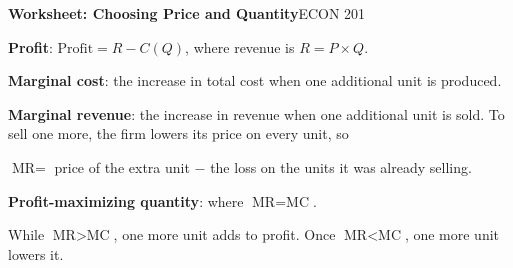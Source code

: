 \documentclass[11pt]{article}
\begin{document}
{\LARGE\bfseries\color{accent} Worksheet: Choosing Price and Quantity}\hfill{\large ECON 201}

\newcommand{\term}[1]{\textcolor{accentdark}{\textbf{#1}}}

\newenvironment{deflist}
  {\begin{list}{\textbullet}{%
     \setlength{\leftmargin}{1.1em}\setlength{\labelwidth}{0.7em}%
     \setlength{\labelsep}{0.4em}\setlength{\itemindent}{0pt}%
     \setlength{\listparindent}{0pt}\setlength{\topsep}{2pt}%
     \setlength{\partopsep}{0pt}\setlength{\parsep}{0pt}%
     \setlength{\itemsep}{2pt}}}
  {\end{list}}

\begin{tcolorbox}[colback=cream, colframe=accent, boxrule=0.6pt, arc=2pt,
  left=6pt, right=6pt, top=4pt, bottom=4pt, title=Definitions,
  fonttitle=\bfseries, coltitle=white]
\begin{deflist}
\item \term{Profit}: $\text{Profit} = R - C(Q)$, where revenue is $R = P \times Q$.
\item \term{Marginal cost}: the increase in total cost when one additional unit
  is produced.
\item \term{Marginal revenue}: the increase in revenue when one additional unit
  is sold. To sell one more, the firm lowers its price on every unit, so
  \begin{deflist}
  \item $\text{MR} = $ price of the extra unit $-$ the loss on the units it
    was already selling.
  \end{deflist}
\item \term{Profit-maximizing quantity}: where $\text{MR} = \text{MC}$.
  \begin{deflist}
  \item While $\text{MR} > \text{MC}$, one more unit adds to profit. Once
    $\text{MR} < \text{MC}$, one more unit lowers it.
  \end{deflist}
\end{deflist}
\end{tcolorbox}
\end{document}
